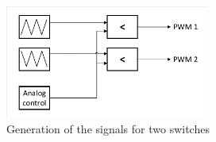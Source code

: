 \begin{figure} [H]
   \centering
   \includegraphics[width=0.6\textwidth]{figures/dConventionalThreeLevelBC/PWMGeneration.pdf}
    \caption{Generation of the signals for two switches}
	\label{fig:PWMS}
\end{figure}

